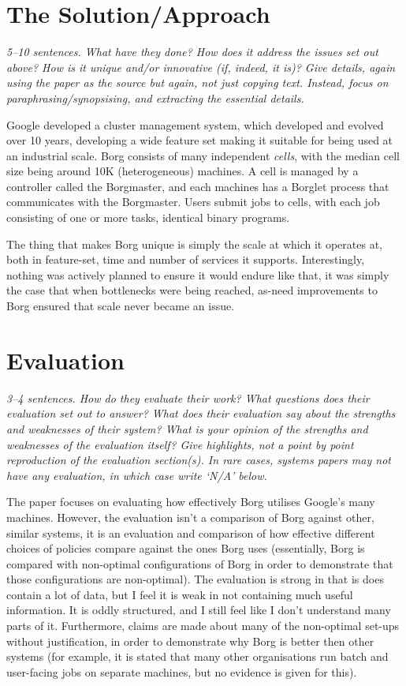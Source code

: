 \documentclass[11pt]{article}
\begin{document}
\section*{The Solution/Approach}

\textsl{5--10 sentences. What have they done? How does it address the issues
set out above? How is it unique and/or innovative (if, indeed, it is)? Give
details, again using the paper as the source but again, not just copying text.
Instead, focus on paraphrasing/synopsising, and extracting the essential
details.}

Google developed a cluster management system, which developed and evolved over
10 years, developing a wide feature set making it suitable for being used at an
industrial scale. Borg consists of many independent \textit{cells}, with the
median cell size being around 10K (heterogeneous) machines. A cell is managed
by a controller called the Borgmaster, and each machines has a Borglet process
that communicates with the Borgmaster. Users submit jobs to cells, with each
job consisting of one or more tasks, identical binary programs.

The thing that makes Borg unique is simply the scale at which it operates at,
both in feature-set, time and number of services it supports. Interestingly,
nothing was actively planned to ensure it would endure like that, it was simply
the case that when bottlenecks were being reached, as-need improvements to Borg
ensured that scale never became an issue.

\section*{Evaluation}

\textsl{3--4 sentences. How do they evaluate their work? What questions does
their evaluation set out to answer? What does their evaluation say about the
strengths and weaknesses of their system? What is your opinion of the strengths
and weaknesses of the evaluation itself? Give highlights, not a point by point
reproduction of the evaluation section(s). In rare cases, systems papers may
not have any evaluation, in which case write `N/A' below.}

The paper focuses on evaluating how effectively Borg utilises Google's many
machines. However, the evaluation isn't a comparison of Borg against other,
similar systems, it is an evaluation and comparison of how effective different
choices of policies compare against the ones Borg uses (essentially, Borg is
compared with non-optimal configurations of Borg in order to demonstrate that
those configurations are non-optimal). The evaluation is strong in that is does
contain a lot of data, but I feel it is weak in not containing much useful
information. It is oddly structured, and I still feel like I don't understand
many parts of it. Furthermore, claims are made about many of the non-optimal
set-ups without justification, in order to demonstrate why Borg is better then
other systems (for example, it is stated that many other organisations run
batch and user-facing jobs on separate machines, but no evidence is given for
this).
\end{document}
